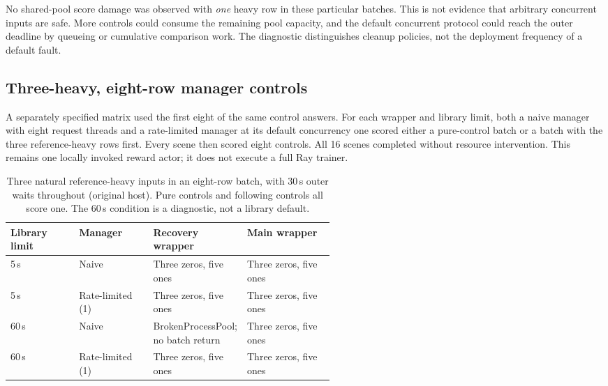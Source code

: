 \documentclass[10pt,a4paper]{article}
\begin{document}
No shared-pool score damage was observed with \emph{one} heavy row in
these particular batches. This is not evidence that arbitrary concurrent
inputs are safe. More controls could consume the remaining pool capacity,
and the default concurrent protocol could reach the outer deadline by
queueing or cumulative comparison work. The diagnostic distinguishes
cleanup policies, not the deployment frequency of a default fault.
\subsection{Three-heavy, eight-row manager controls}

A separately specified matrix used the first eight of the same control
answers. For each wrapper and library limit, both a naive manager with
eight request threads and a rate-limited manager at its default concurrency
one scored either a pure-control batch or a batch with the three
reference-heavy rows first. Every scene then scored eight controls. All
16 scenes completed without resource intervention. This remains one
locally invoked reward actor; it does not execute a full Ray trainer.

\begin{table}[h]
\centering\small
\begin{tabular}{@{}llp{0.27\linewidth}p{0.27\linewidth}@{}}
\toprule
Library limit & Manager & Recovery wrapper & Main wrapper \\
\midrule
5\,s & Naive & Three zeros, five ones & Three zeros, five ones \\
5\,s & Rate-limited (1) & Three zeros, five ones & Three zeros, five ones \\
60\,s & Naive & BrokenProcessPool; no batch return & Three zeros, five ones \\
60\,s & Rate-limited (1) & Three zeros, five ones & Three zeros, five ones \\
\bottomrule
\end{tabular}
\caption{Three natural reference-heavy inputs in an eight-row batch,
with 30\,s outer waits throughout (original host). Pure controls and following controls
all score one. The 60\,s condition is a diagnostic, not a library default.}
\label{tab:threeheavy}
\end{table}
\end{document}

